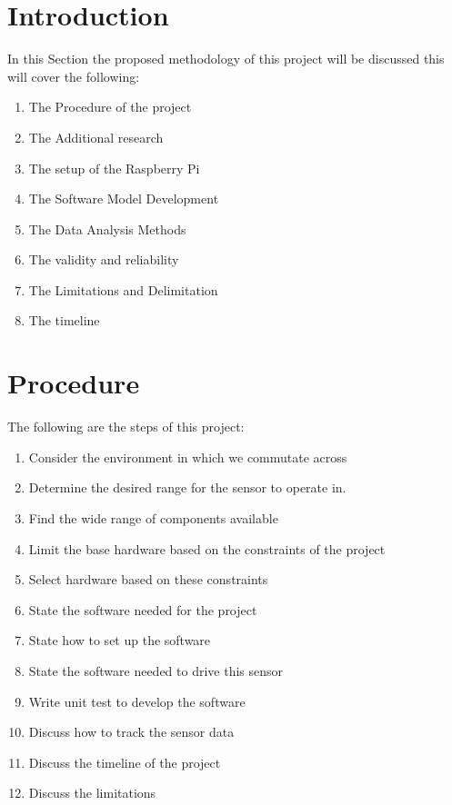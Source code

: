 
\section{Introduction}
In this  Section the  proposed  methodology of this  project will be discussed this will cover the  following:
\begin{enumerate}
    \item The Procedure of the project
    \item The Additional research
    \item The setup of the Raspberry Pi
    \item The Software Model Development
    \item The Data Analysis Methods
    \item The validity and reliability 
    \item The Limitations and Delimitation
    \item The timeline
\end{enumerate} 
\section{Procedure}
The following are the steps of this project:
\begin{enumerate}
    \item Consider the environment in which we commutate across
    \item Determine the desired range for the sensor to operate in.
    \item Find the wide range of components available
    \item Limit the base hardware based on the constraints of the project
    \item Select hardware based on these constraints
    \item State the software needed for the project
    \item State how to set up the software
    \item State the software needed to drive this sensor
    \item Write unit test to develop the software
    \item Discuss how to track the sensor data
    \item Discuss the timeline of the project
    \item Discuss the limitations 
  
\end{enumerate}
